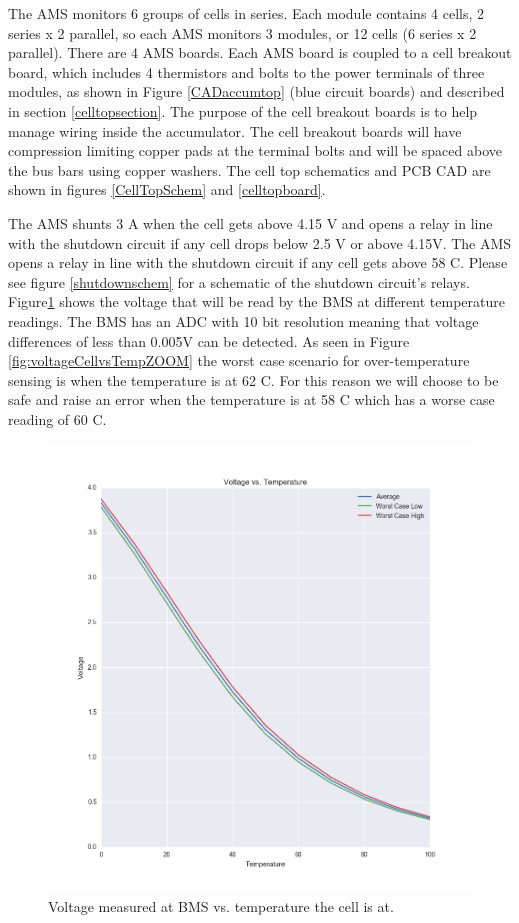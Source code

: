 \documentclass{article}
\begin{document}
    The AMS monitors 6 groups of cells in series. Each module contains 4 cells, 2 series x 2 parallel, so each AMS monitors 3 modules, or 12 cells (6 series x 2 parallel). There are 4 AMS boards. Each AMS board is coupled to a cell breakout board, which includes 4 thermistors and bolts to the power terminals of three modules, as shown in Figure \ref{CADaccumtop} (blue circuit boards) and described in section \ref{celltopsection}. The purpose of the cell breakout boards is to help manage wiring inside the accumulator. The cell breakout boards will have compression limiting copper pads at the terminal bolts and will be spaced above the bus bars using copper washers. The cell top schematics and PCB CAD are shown in figures \ref{CellTopSchem} and \ref{celltopboard}.

    The AMS shunts 3 A when the cell gets above 4.15 V and opens a relay in line with the shutdown circuit if any cell drops below 2.5 V or above 4.15V. The AMS opens a relay in line with the shutdown circuit if any cell gets above 58 \degree C. Please see figure \ref{shutdownschem} for a schematic of the shutdown circuit's relays.\\

    Figure\ref{fig:voltageCellvsTemp} shows the voltage that will be read by the BMS at different temperature readings. The BMS has an ADC with 10 bit resolution meaning that voltage differences of less than 0.005V can be detected. As seen in Figure \ref{fig:voltageCellvsTempZOOM} the worst case scenario for over-temperature sensing is when the temperature is at 62 \degree C. For this reason we will choose to be safe and raise an error when the temperature is at 58 \degree C which has a worse case reading of 60 \degree C.

        \begin{figure}[H]
        \centering
        \includegraphics[width =0.6 \textwidth]{VoltageVSTemp.png}
        \caption{Voltage measured at BMS vs. temperature the cell is at.}
        \label{fig:voltageCellvsTemp}
        \end{figure}
\end{document}
